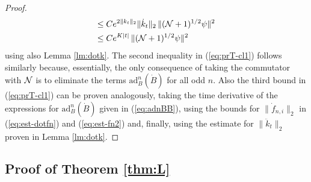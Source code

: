 \documentclass[11pt,a4paper]{article}
\newcommand{\ech}[2]{#2}	%
\newcommand{\ekt}{e^{K\lvert t\rvert}}	%
\newcommand{\cN}{{\cal N}}
\begin{document}
\begin{proof}
\[\begin{split}
\leq \; & C e^{2\| k_t \|_2} \| \dot{k}_t \|_2 \, \| (\cN+1)^{1/2} \psi \|^2 \\
\leq \; & C \ech{\| \varphi_t^{(N)} \|_{H^2}}{\ekt} \, \| (\cN+1)^{1/2} \psi \|^2 
\end{split}
\]
using also Lemma \ref{lm:dotk}. The second inequality in (\ref{eq:prT-cl1}) follows similarly because, essentially, the only consequence of taking the commutator with $\cN$ is to eliminate the terms $\text{ad}^n_B (\dot{B})$ for all odd $n$. Also the third bound in (\ref{eq:prT-cl1}) can be proven analogously, taking the time derivative of the expressions for $\text{ad}^n_B (\dot{B})$ given in (\ref{eq:adnBB}), using the bounds for $\| \dot f_{n,i} \|_2$ in (\ref{eq:est-dotfn}) and (\ref{eq:est-fn2}) and, finally, using the estimate for $\| \ddot k_t \|_2$ proven in Lemma \ref{lm:dotk}.
\end{proof}

\subsection{Proof of Theorem \ref{thm:L}}
\label{sub:thmL}
\end{document}
